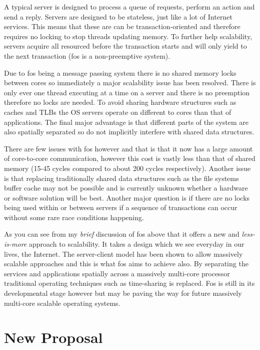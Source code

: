 \documentclass[journal]{IEEEtran}
\begin{document}
A typical server is designed to process a queue of requests, perform an action and send a reply. Servers are designed to be stateless, just like a lot of Internet services. This means that these are can be transaction-oriented and therefore requires no locking to stop threads updating memory. To further help scalability, servers acquire all resourced before the transaction starts and will only yield to the next transaction (fos is a non-preemptive system).

Due to fos being a message passing system there is no shared memory locks between cores so immediately a major scalability issue has been resolved. There is only ever one thread executing at a time on a server and there is no preemption therefore no locks are needed. To avoid sharing hardware structures such as caches and TLBs the OS servers operate on different to cores than that of applications. The final major advantage is that different parts of the system are also spatially separated so do not implicitly interfere with shared data structures.  

There are few issues with fos however and that is that it now has a large amount of core-to-core communication, however this cost is vastly less than that of shared memory (15-45 cycles compared to about 200 cycles respectively). Another issue is that replacing traditionally shared data structures such as the file systems buffer cache may not be possible and is currently unknown whether a hardware or software solution will be best. Another major question is if there are no locks being used within or between servers if a sequence of transactions can occur without some rare race conditions happening.

As you can see from my \emph{brief} discussion of fos above that it offers a new and \emph{less-is-more} approach to scalability. It takes a design which we see everyday in our lives, the Internet. The server-client model has been shown to allow massively scalable approaches and this is what fos aims to achieve also. By separating the services and applications spatially across a massively multi-core processor traditional operating techniques such as time-sharing is replaced. Fos is still in its developmental stage however but may be paving the way for future massively multi-core scalable operating systems.

\section{New Proposal}
\end{document}
